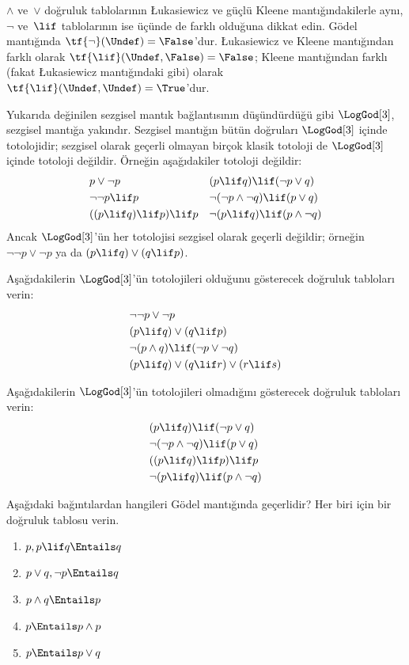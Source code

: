 $\land$ ve~$\lor$ doğruluk tablolarının \L ukasiewicz ve güçlü Kleene
mantığındakilerle aynı, $\lnot$ ve~$\lif$ tablolarının ise üçünde de farklı
olduğuna dikkat edin. G\"odel mantığında
$\tf{\lnot}(\Undef) = \False$'dur. \L ukasiewicz ve Kleene mantığından farklı
olarak $\tf{\lif}(\Undef, \False) = \False$; Kleene mantığından farklı
(fakat \L ukasiewicz mantığındaki gibi) olarak
$\tf{\lif}(\Undef, \Undef) = \True$'dur.

Yukarıda değinilen sezgisel mantık bağlantısının düşündürdüğü gibi
$\LogGod[3]$, sezgisel mantığa yakındır. Sezgisel mantığın bütün doğruları
$\LogGod[3]$ içinde totolojidir; sezgisel olarak geçerli olmayan birçok
klasik totoloji de $\LogGod[3]$ içinde totoloji değildir. Örneğin
aşağıdakiler totoloji değildir:
\begin{align*}
  & p \lor \lnot p && (p \lif q) \lif (\lnot p \lor q) \\
  & \lnot\lnot p \lif p && \lnot(\lnot p \land \lnot q) \lif (p \lor q) \\
  & ((p \lif q) \lif p) \lif p && \lnot(p \lif q) \lif (p \land \lnot q)
\end{align*}
Ancak $\LogGod[3]$'ün her totolojisi sezgisel olarak geçerli değildir;
örneğin $\lnot\lnot p \lor \lnot p$ ya da
$(p \lif q) \lor (q \lif p)$.

\begin{prob}
  Aşağıdakilerin $\LogGod[3]$'ün totolojileri olduğunu gösterecek doğruluk
  tabloları verin:
  \begin{align*}
    & \lnot\lnot p \lor \lnot p\\
    & (p \lif q) \lor (q \lif p) \\
    & \lnot(p \land q) \lif (\lnot p \lor \lnot q) \\
    & (p \lif q) \lor (q \lif r) \lor (r \lif s)
  \end{align*}
\end{prob}

\begin{prob}
  Aşağıdakilerin $\LogGod[3]$'ün totolojileri olmadığını gösterecek doğruluk
  tabloları verin:
  \begin{align*}
    & (p \lif q) \lif (\lnot p \lor q) \\
    & \lnot(\lnot p \land \lnot q) \lif (p \lor q) \\
    & ((p \lif q) \lif p) \lif p \\
    & \lnot(p \lif q) \lif (p \land \lnot q)
  \end{align*}
\end{prob}

\begin{prob}
  Aşağıdaki bağıntılardan hangileri G\"odel mantığında geçerlidir? Her biri
  için bir doğruluk tablosu verin.
  \begin{enumerate}
    \item $p, p \lif q \Entails q$
    \item $p \lor q, \lnot p \Entails q$
    \item $p \land q \Entails p$
    \item $p \Entails p \land p$
    \item $p \Entails p \lor q$
  \end{enumerate}
\end{prob}

